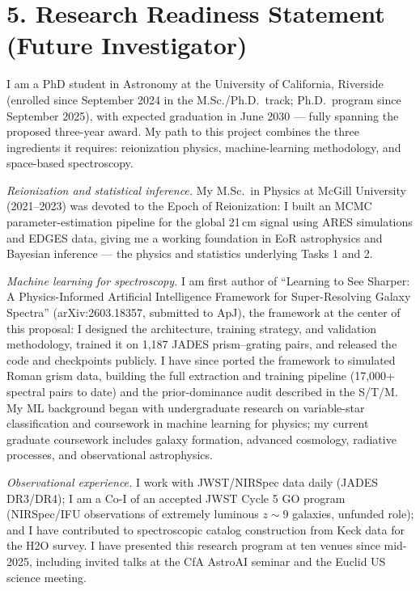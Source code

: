 \documentclass[12pt,letterpaper]{article}
\begin{document}
\clearpage
\section*{5. Research Readiness Statement (Future Investigator)}

I am a PhD student in Astronomy at the University of California,
Riverside (enrolled since September 2024 in the M.Sc./Ph.D.\ track;
Ph.D.\ program since September 2025), with expected graduation in June
2030 --- fully spanning the proposed three-year award. My path to this
project combines the three ingredients it requires: reionization physics,
machine-learning methodology, and space-based spectroscopy.

\emph{Reionization and statistical inference.} My M.Sc.\ in Physics at
McGill University (2021--2023) was devoted to the Epoch of Reionization:
I built an MCMC parameter-estimation pipeline for the global 21\,cm
signal using ARES simulations and EDGES data, giving me a working
foundation in EoR astrophysics and Bayesian inference --- the physics and
statistics underlying Tasks 1 and 2.

\emph{Machine learning for spectroscopy.} I am first author of
``Learning to See Sharper: A Physics-Informed Artificial Intelligence
Framework for Super-Resolving Galaxy Spectra'' (arXiv:2603.18357,
submitted to ApJ), the framework at the center of this proposal: I
designed the architecture, training strategy, and validation
methodology, trained it on 1,187 JADES prism--grating pairs, and released
the code and checkpoints publicly. I have since ported the framework to
simulated Roman grism data, building the full extraction and
training pipeline (17,000+ spectral pairs to date) and the
prior-dominance audit described in the S/T/M. My ML background began with
undergraduate research on variable-star classification and coursework in
machine learning for physics; my current graduate coursework includes
galaxy formation, advanced cosmology, radiative processes, and
observational astrophysics.

\emph{Observational experience.} I work with JWST/NIRSpec data daily
(JADES DR3/DR4); I am a Co-I of an accepted JWST Cycle 5 GO program
(NIRSpec/IFU observations of extremely luminous $z\sim9$ galaxies,
unfunded role); and I have contributed to spectroscopic catalog
construction from Keck data for the H2O survey. I have presented this research program at ten venues
since mid-2025, including invited talks at the CfA AstroAI seminar and
the Euclid US science meeting.
\end{document}
